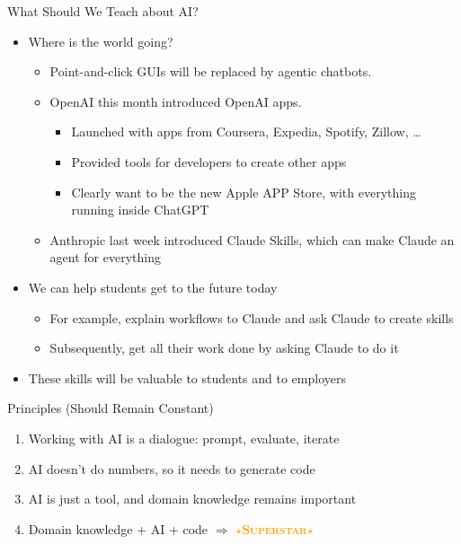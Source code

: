 \documentclass[aspectratio=169]{beamer}
\begin{document}
\begin{frame}{What Should We Teach about AI?}

\begin{itemize}
\item Where is the world going?
\begin{itemize}
\item Point-and-click GUIs will be replaced by agentic chatbots.
\item OpenAI this month introduced OpenAI apps.  
\begin{itemize}
\item Launched with apps from Coursera, Expedia, Spotify,
Zillow, \ldots 
\item Provided tools for developers to create other apps
\item Clearly want to be the new Apple APP Store, with everything running inside ChatGPT
\end{itemize}
\item Anthropic last week introduced Claude Skills, which can make Claude an agent for everything 
\end{itemize}
\pause
\item We can help students get to the future today
\begin{itemize}
\item For example, explain workflows to Claude and ask Claude to create skills
\item Subsequently, get all their work done by asking Claude to do it
\end{itemize}
\pause
\item These skills will be valuable to students and to employers
\end{itemize}

\end{frame}



\begin{frame}{Principles (Should Remain Constant)}
\begin{enumerate}
\item Working with AI is a dialogue: prompt, evaluate, iterate
\item AI doesn't do numbers, so it needs to generate code
\item AI is just a tool, and domain knowledge remains important 
\pause
\item Domain knowledge + AI + code $\Rightarrow$ \textcolor{orange}{$\star$\textbf{\textsc{Superstar}}$\star$}
\end{enumerate}
\end{frame}
\end{document}
